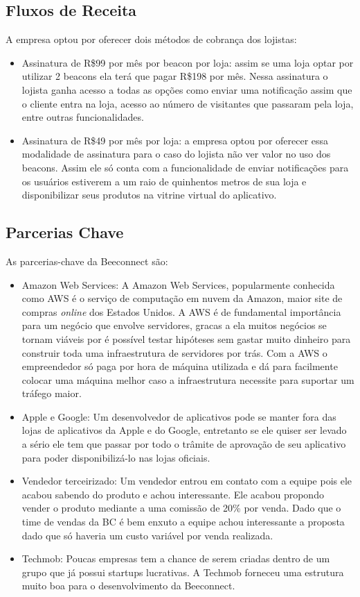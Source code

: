 \subsection{Fluxos de Receita}
\label{cha:fluxos_de_receita_canvas_bc_1}
A empresa optou por oferecer dois métodos de cobrança dos lojistas:
\begin{itemize}
\item Assinatura de R\$99 por mês por beacon por loja: assim se uma loja optar por utilizar 2 beacons ela terá que pagar R\$198 por mês. Nessa assinatura o lojista ganha acesso a todas as opções como enviar uma notificação assim que o cliente entra na loja, acesso ao número de visitantes que passaram pela loja, entre outras funcionalidades.
\item Assinatura de R\$49 por mês por loja: a empresa optou por oferecer essa modalidade de assinatura para o caso do lojista não ver valor no uso dos beacons. Assim ele só conta com a funcionalidade de enviar notificações para os usuários estiverem a um raio de quinhentos metros de sua loja e disponibilizar seus produtos na vitrine virtual do aplicativo.
\end{itemize}

\subsection{Parcerias Chave}
\label{cha:parcerias_chave}
As parcerias-chave da Beeconnect são:
\begin{itemize}
\item Amazon Web Services: A Amazon Web Services, popularmente conhecida como AWS é o serviço de computação em nuvem da Amazon, maior site de compras \textit{online} dos Estados Unidos. A AWS é de fundamental importância para um negócio que envolve servidores, gracas a ela muitos negócios se tornam viáveis por é possível testar hipóteses sem gastar muito dinheiro para construir toda uma infraestrutura de servidores por trás. Com a AWS o empreendedor só paga por hora de máquina utilizada e dá para facilmente colocar uma máquina melhor caso a infraestrutura necessite para suportar um tráfego maior.
\item Apple e Google: Um desenvolvedor de aplicativos pode se manter fora das lojas de aplicativos da Apple e do Google, entretanto se ele quiser ser levado a sério ele tem que passar por todo o trâmite de aprovação de seu aplicativo para poder disponibilizá-lo nas lojas oficiais. 
\item Vendedor terceirizado: Um vendedor entrou em contato com a equipe pois ele acabou sabendo do produto e achou interessante. Ele acabou propondo vender o produto mediante a uma comissão de 20\% por venda. Dado que o time de vendas da BC é bem enxuto a equipe achou interessante a proposta dado que só haveria um custo variável por venda realizada.
\item Techmob: Poucas empresas tem a chance de serem criadas dentro de um grupo que já possui startups lucrativas. A Techmob forneceu uma estrutura muito boa para o desenvolvimento da Beeconnect.
\end{itemize}

